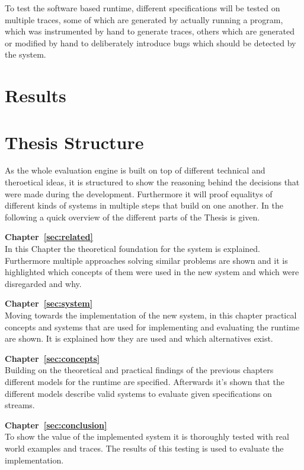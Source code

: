 To test the software based runtime, different specifications will be tested on multiple traces, some of which are generated by actually running a program,
which was instrumented by hand to generate traces, others which are generated or modified by hand to deliberately introduce bugs which should be detected by the system.

\section{Results}
\label{sec:intro:results}


\section{Thesis Structure}
\label{sec:intro:structure}

As the whole evaluation engine is built on top of different technical and theroetical ideas, it is structured to show
the reasoning behind the decisions that were made during the development.
Furthermore it will proof equalitys of different kinds of systems in multiple steps that build on one another.
In the following a quick overview of the different parts of the Thesis is given.

\textbf{Chapter~\ref{sec:related}} \\[0.2em]

In this Chapter the theoretical foundation for the system is explained.
Furthermore multiple approaches solving similar problems are shown and it is highlighted which concepts of them were
used in the new system and which were disregarded and why.

\textbf{Chapter~\ref{sec:system}} \\[0.2em]

Moving towards the implementation of the new system, in this chapter practical concepts and systems that are used for implementing
and evaluating the runtime are shown.
It is explained how they are used and which alternatives exist.

\textbf{Chapter~\ref{sec:concepts}} \\[0.2em]

Building on the theoretical and practical findings of the previous chapters different models for the runtime are specified.
Afterwards it's shown that the different models describe valid systems to evaluate given specifications on streams.

\textbf{Chapter~\ref{sec:conclusion}} \\[0.2em]

To show the value of the implemented system it is thoroughly tested with real world examples and traces.
The results of this testing is used to evaluate the implementation.

